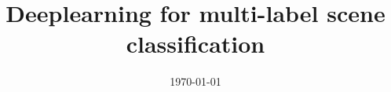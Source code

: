 \documentclass[a4paper, 11pt, oneside]{Thesis}  %
\begin{document}
\frontmatter	  %

\title  {Deeplearning for multi-label scene classification}
\addresses  {\groupname\\\deptname\\\univname}  %
\date       {\today}
\subject    {}
\keywords   {}

\maketitle


\fancyhead{}  %
\rhead{\thepage}  %
\lhead{}  %

\pagestyle{fancy}  %
\end{document}
